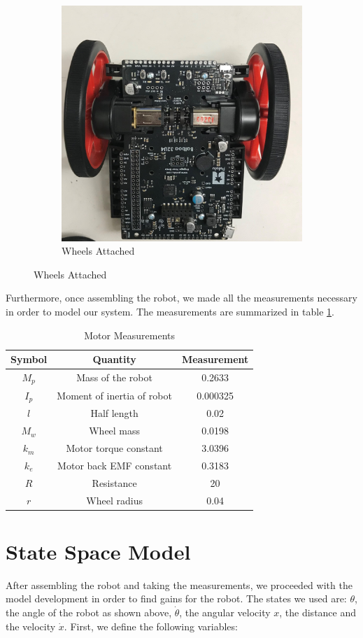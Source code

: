 \documentclass{article}
\begin{document}
\begin{figure}[H]
    \begin{subfigure}{0.99 \textwidth}
        \centering
        \includegraphics[width=0.45\linewidth]{robot2.jpg}
        \caption{Wheels Attached}
        \label{robot2}
    \end{subfigure}
\end{figure}

Furthermore, once assembling the robot, we made all the measurements necessary in order to model our system. The measurements are summarized in table \ref{motorMeas}.

\begin{table}[H]
    \centering
    \begin{tabular}{| c | c | c |}
        \hline   
        Symbol & Quantity & Measurement \\
        \hline
        $M_p$ & Mass of the robot & 0.2633\\
        $I_p$ & Moment of inertia of robot & 0.000325 \\
        $l$ & Half length & 0.02      \\
        $M_w$ & Wheel mass & 0.0198 \\
        $k_m$ & Motor torque constant & 3.0396\\
        $k_e$ & Motor back EMF constant & 0.3183 \\
        $R$ & Resistance & 20 \\
        $r$ & Wheel radius & 0.04 \\
        \hline
    \end{tabular}
    \caption{Motor Measurements}
    \label{motorMeas}
\end{table}

\vspace{5mm}
\section{State Space Model}

After assembling the robot and taking the measurements, we proceeded with the model development in order to find gains for the robot. The states we used are: $\theta$, the angle of the robot as shown above, $\dot \theta$, the angular velocity $x$, the distance and the velocity $\dot x$. 
First, we define the following variables:
\end{document}

